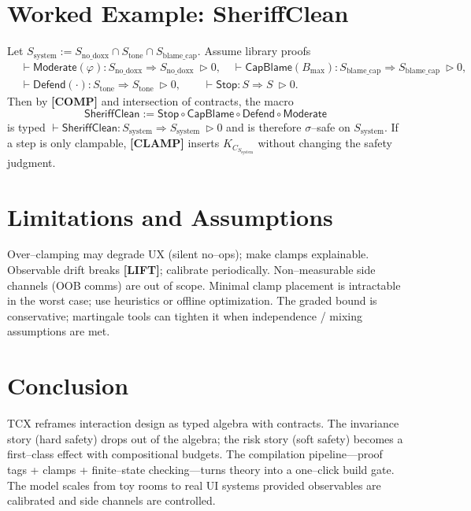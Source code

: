 \documentclass[11pt]{article}
\theoremstyle{definition}
\theoremstyle{plain}
\theoremstyle{remark}
\newcommand{\1}{\mathbf{1}}
\newcommand{\clamp}{C}
\begin{document}
\section{Worked Example: \textsf{SheriffClean}}
Let $S_{\text{system}} := S_{\text{no\_doxx}} \cap S_{\text{tone}} \cap S_{\text{blame\_cap}}$. Assume library proofs
\begin{align*}
&\vdash \textsf{Moderate}(\varphi) : S_{\text{no\_doxx}}\Rightarrow S_{\text{no\_doxx}}\ \triangleright 0,\quad
\vdash \textsf{CapBlame}(B_{\max}): S_{\text{blame\_cap}}\Rightarrow S_{\text{blame\_cap}}\ \triangleright 0,\\
&\vdash \textsf{Defend}(\cdot): S_{\text{tone}}\Rightarrow S_{\text{tone}}\ \triangleright 0,\qquad
\vdash \textsf{Stop}: S\Rightarrow S\ \triangleright 0.
\end{align*}
Then by \textbf{[COMP]} and intersection of contracts, the macro
\[\textsf{SheriffClean} := \textsf{Stop} \circ \textsf{CapBlame} \circ \textsf{Defend} \circ \textsf{Moderate}\]
is typed $\vdash \textsf{SheriffClean}: S_{\text{system}}\Rightarrow S_{\text{system}}\ \triangleright 0$ and is therefore $\sigma$--safe on $S_{\text{system}}$. If a step is only clampable, \textbf{[CLAMP]} inserts $K_{\clamp_{S_{\text{system}}}}$ without changing the safety judgment.

\section{Limitations and Assumptions}
Over--clamping may degrade UX (silent no--ops); make clamps explainable. Observable drift breaks \textbf{[LIFT]}; calibrate periodically. Non--measurable side channels (OOB comms) are out of scope. Minimal clamp placement is intractable in the worst case; use heuristics or offline optimization. The graded bound is conservative; martingale tools can tighten it when independence / mixing assumptions are met.

\section{Conclusion}
TCX reframes interaction design as typed algebra with contracts. The invariance story (hard safety) drops out of the algebra; the risk story (soft safety) becomes a first--class effect with compositional budgets. The compilation pipeline---proof tags + clamps + finite--state checking---turns theory into a one--click build gate. The model scales from toy rooms to real UI systems provided observables are calibrated and side channels are controlled.
\end{document}
